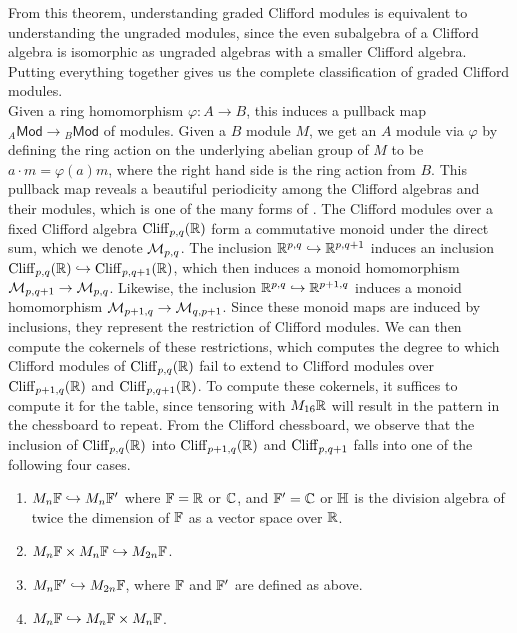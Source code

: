 %
From this theorem, understanding graded Clifford modules is equivalent to understanding
the ungraded modules, since the even subalgebra of a Clifford algebra is isomorphic
as ungraded algebras with a smaller Clifford algebra. Putting everything together
gives us the complete classification of graded Clifford modules.\\
%
Given a ring homomorphism $\varphi : A \to B$, this induces a pullback map
${}_A\mathsf{Mod} \to {}_B\mathsf{Mod}$ of modules. Given a $B$ module $M$,
we get an $A$ module via $\varphi$ by defining the ring action on the underlying
abelian group of $M$ to be $a \cdot m = \varphi(a)m$, where the right hand side
is the ring action from $B$. This pullback map reveals a beautiful periodicity
among the Clifford algebras and their modules, which is one of the many forms
of . The Clifford modules over a fixed Clifford algebra
$\operatorname{Cliff}_{p,q}(\mathbb{R})$ form a commutative monoid under the direct sum, which
we denote $\mathcal{M}_{p,q}$. The inclusion $\mathbb{R}^{p,q} \hookrightarrow \mathbb{R}^{p,q+1}$ induces
an inclusion $\operatorname{Cliff}_{p,q}(\mathbb{R}) \hookrightarrow \operatorname{Cliff}_{p,q+1}(\mathbb{R})$, which then
induces a monoid homomorphism $\mathcal{M}_{p,q+1} \to \mathcal{M}_{p,q}$. Likewise, the inclusion
$\mathbb{R}^{p,q}\hookrightarrow \mathbb{R}^{p+1,q}$ induces a monoid homomorphism
$\mathcal{M}_{p+1,q} \to \mathcal{M}_{q,p+1}$. Since these monoid maps are induced by
inclusions, they represent the restriction of Clifford modules. We can then
compute the cokernels of these restrictions, which computes the degree to
which Clifford modules of $\operatorname{Cliff}_{p,q}(\mathbb{R})$ fail to extend to Clifford modules
over $\operatorname{Cliff}_{p+1,q}(\mathbb{R})$ and $\operatorname{Cliff}_{p,q+1}(\mathbb{R})$. To compute these cokernels,
it suffices to compute it for the table, since tensoring with $M_{16}\mathbb{R}$ will
result in the pattern in the chessboard to repeat. From the Clifford chessboard,
we observe that the inclusion of $\operatorname{Cliff}_{p,q}(\mathbb{R})$ into $\operatorname{Cliff}_{p+1,q}(\mathbb{R})$
and $\operatorname{Cliff}_{p,q+1}$ falls into one of the following four cases.
%
\begin{enumerate}
  \item $M_n\mathbb{F} \hookrightarrow M_n\mathbb{F}'$ where $\mathbb{F} = \mathbb{R}$ or $\mathbb{C}$, and $\mathbb{F}' = \mathbb{C}$
  or $\mathbb{H}$ is the division algebra of twice the dimension of $\mathbb{F}$ as a
  vector space over $\mathbb{R}$.
  \item $M_n\mathbb{F} \times M_n\mathbb{F} \hookrightarrow M_{2n}\mathbb{F}$.
  \item $M_n\mathbb{F}' \hookrightarrow M_{2n}\mathbb{F}$, where $\mathbb{F}$ and $\mathbb{F}'$ are defined as above.
  \item $M_n\mathbb{F} \hookrightarrow M_n\mathbb{F} \times M_n\mathbb{F}$.
\end{enumerate}
